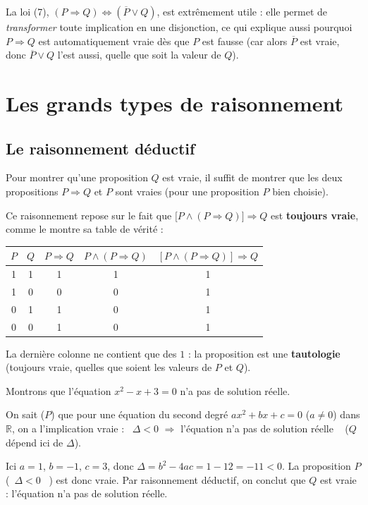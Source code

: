 \documentclass[a4paper,12pt,openany]{book}
\providecommand{\og}{\guillemotleft~}
\providecommand{\fg}{\ifhmode~\fi\guillemotright}
\begin{document}
\begin{remarque}
La loi (7), $(P\Rightarrow Q)\iff(\overline{P}\vee Q)$, est extrêmement utile :
elle permet de \emph{transformer} toute implication en une disjonction, ce qui
explique aussi pourquoi $P\Rightarrow Q$ est automatiquement vraie dès que $P$
est fausse (car alors $\overline{P}$ est vraie, donc $\overline{P}\vee Q$ l'est
aussi, quelle que soit la valeur de $Q$).
\end{remarque}


\section{Les grands types de raisonnement}


\subsection{Le raisonnement déductif}

\begin{proposition}[Principe]
Pour montrer qu'une proposition $Q$ est vraie, il suffit de montrer que les
deux propositions $P\Rightarrow Q$ et $P$ sont vraies (pour une proposition
$P$ bien choisie).
\end{proposition}

Ce raisonnement repose sur le fait que $\big[P \wedge (P\Rightarrow
Q)\big] \Rightarrow Q$ est \textbf{toujours vraie}, comme le montre sa table
de vérité :

\begin{center}
\begin{tabular}{|c|c|c|c|c|}
\hline
$P$ & $Q$ & $P\Rightarrow Q$ & $P\wedge(P\Rightarrow Q)$ & $[P\wedge(P\Rightarrow Q)]\Rightarrow Q$\\
\hline
1 & 1 & 1 & 1 & 1 \\
1 & 0 & 0 & 0 & 1 \\
0 & 1 & 1 & 0 & 1 \\
0 & 0 & 1 & 0 & 1 \\
\hline
\end{tabular}
\end{center}

La dernière colonne ne contient que des $1$ : la proposition est une
\textbf{tautologie} (toujours vraie, quelles que soient les valeurs de $P$ et
$Q$).

\begin{exemple}
Montrons que l'équation $x^2-x+3=0$ n'a pas de solution réelle.

On sait ($P$) que pour une équation du second degré $ax^2+bx+c=0$ ($a\neq0$)
dans $\mathbb{R}$, on a l'implication vraie : \og $\Delta<0$ $\Rightarrow$
l'équation n'a pas de solution réelle \fg{} ($Q$ dépend ici de $\Delta$).

Ici $a=1$, $b=-1$, $c=3$, donc $\Delta = b^2-4ac = 1-12=-11<0$. La proposition
$P$ (\og $\Delta<0$ \fg) est donc vraie. Par raisonnement déductif, on conclut
que $Q$ est vraie : l'équation n'a pas de solution réelle.
\end{exemple}
\end{document}

